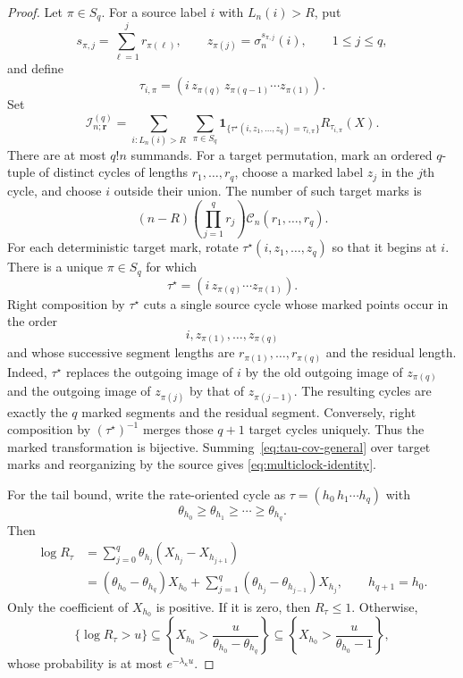 \documentclass[11pt]{article}
\theoremstyle{remark}
\newcommand{\one}{\mathbf 1}
\begin{document}
\begin{proof}
Let $\pi\in S_q$.  For a source label $i$ with $L_n(i)>R$, put
\[
 s_{\pi,j}=\sum_{\ell=1}^j r_{\pi(\ell)},
 \qquad
 z_{\pi(j)}=\sigma_n^{s_{\pi,j}}(i),
 \qquad 1\le j\le q,
\]
and define
\begin{equation}
\label{eq:tau-pi}
 \tau_{i,\pi}=(i\,z_{\pi(q)}\,z_{\pi(q-1)}\cdots z_{\pi(1)}).
\end{equation}
Set
\begin{equation}
\label{eq:Iq}
 \mathcal I_{n;\mathbf r}^{(q)}
 =\sum_{i:L_n(i)>R}\ \sum_{\pi\in S_q}
 \one_{\{\tau^\star(i,z_1,\ldots,z_q)=\tau_{i,\pi}\}}
 R_{\tau_{i,\pi}}(X).
\end{equation}
There are at most $q!n$ summands.
For a target permutation, mark an ordered $q$-tuple of distinct cycles of
lengths $r_1,\ldots,r_q$, choose a marked label $z_j$ in the $j$th cycle,
and choose $i$ outside their union.  The number of such target marks is
\[
 (n-R)\left(\prod_{j=1}^q r_j\right)
 \mathcal C_n(r_1,\ldots,r_q).
\]
For each deterministic target mark, rotate
$\tau^\star(i,z_1,\ldots,z_q)$ so that it begins at $i$.  There is a unique
$\pi\in S_q$ for which
\[
 \tau^\star=(i\,z_{\pi(q)}\cdots z_{\pi(1)}).
\]
Right composition by $\tau^\star$ cuts a single source cycle whose marked
points occur in the order
\[
 i,z_{\pi(1)},\ldots,z_{\pi(q)}
\]
and whose successive segment lengths are
$r_{\pi(1)},\ldots,r_{\pi(q)}$ and the residual length.  Indeed,
$\tau^\star$ replaces the outgoing image of $i$ by the old outgoing image
of $z_{\pi(q)}$ and the outgoing image of $z_{\pi(j)}$ by that of
$z_{\pi(j-1)}$.  The resulting cycles are exactly the $q$ marked segments
and the residual segment.  Conversely, right composition by
$(\tau^\star)^{-1}$ merges those $q+1$ target cycles uniquely.  Thus the
marked transformation is bijective.  Summing~\eqref{eq:tau-cov-general}
over target marks and reorganizing by the source gives
\eqref{eq:multiclock-identity}.

For the tail bound, write the rate-oriented cycle as
$\tau=(h_0\,h_1\cdots h_q)$ with
\[
 \theta_{h_0}\ge\theta_{h_1}\ge\cdots\ge\theta_{h_q}.
\]
Then
\begin{align*}
 \log R_\tau
 &=\sum_{j=0}^q\theta_{h_j}(X_{h_j}-X_{h_{j+1}})\\
 &=(\theta_{h_0}-\theta_{h_q})X_{h_0}
   +\sum_{j=1}^q(\theta_{h_j}-\theta_{h_{j-1}})X_{h_j},
 \qquad h_{q+1}=h_0.
\end{align*}
Only the coefficient of $X_{h_0}$ is positive.  If it is zero, then
$R_\tau\le1$.  Otherwise,
\[
 \{\log R_\tau>u\}
 \subseteq
 \left\{X_{h_0}>\frac{u}{\theta_{h_0}-\theta_{h_q}}\right\}
 \subseteq
 \left\{X_{h_0}>\frac{u}{\theta_{h_0}-1}\right\},
\]
whose probability is at most $e^{-\lambda_\kappa u}$.


\end{proof}
\end{document}
